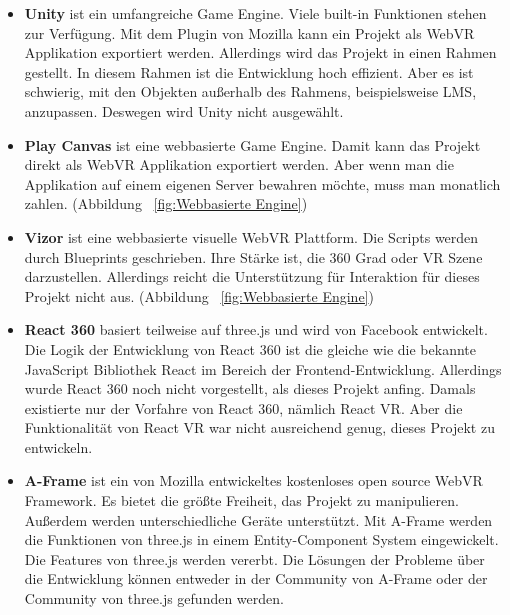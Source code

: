  \begin{itemize}
 
     \item \textbf{Unity} \citep{37} ist ein umfangreiche Game Engine. Viele built-in Funktionen stehen zur Verfügung. Mit dem Plugin von Mozilla kann ein Projekt als WebVR Applikation exportiert werden. Allerdings wird das Projekt in einen Rahmen gestellt. In diesem Rahmen ist die Entwicklung hoch effizient. Aber es ist schwierig, mit den Objekten außerhalb des Rahmens, beispielsweise LMS, anzupassen. Deswegen wird Unity nicht ausgewählt.
     
     \item \textbf{Play Canvas} \citep{38} ist eine webbasierte Game Engine. Damit kann das Projekt direkt als WebVR Applikation exportiert werden. Aber wenn man die Applikation auf einem eigenen Server bewahren möchte, muss man monatlich zahlen. (Abbildung ~\ref{fig:Webbasierte Engine})
     
     \item \textbf{Vizor} \citep{39} ist eine webbasierte visuelle WebVR Plattform. Die Scripts werden durch Blueprints geschrieben. Ihre Stärke ist, die 360 Grad oder VR Szene darzustellen. Allerdings reicht die Unterstützung für Interaktion für dieses Projekt nicht aus. (Abbildung ~\ref{fig:Webbasierte Engine})
     
     \item \textbf{React 360} \citep{40} basiert teilweise auf three.js und wird von Facebook entwickelt. Die Logik der Entwicklung von React 360 ist die gleiche wie die bekannte JavaScript Bibliothek React im Bereich der Frontend-Entwicklung. Allerdings wurde React 360 noch nicht vorgestellt, als dieses Projekt anfing. Damals existierte nur der Vorfahre von React 360, nämlich React VR. Aber die Funktionalität von React VR war nicht ausreichend genug, dieses Projekt zu entwickeln.
     
     \item \textbf{A-Frame} \citep{41} ist ein von Mozilla entwickeltes kostenloses open source WebVR Framework. Es bietet die größte Freiheit, das Projekt zu manipulieren. Außerdem werden unterschiedliche Geräte unterstützt. Mit A-Frame werden die Funktionen von three.js in einem Entity-Component System eingewickelt. Die Features von three.js werden vererbt. Die Lösungen der Probleme über die Entwicklung können entweder in der Community von A-Frame oder der Community von three.js gefunden werden.
     
 \end{itemize}
 
